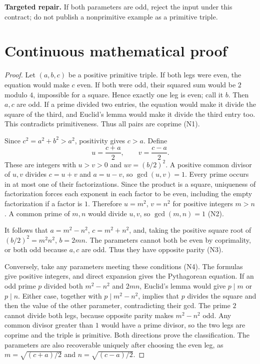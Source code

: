 \documentclass[preprint,12pt,aps,pra,showkeys,amsmath,amssymb,superscriptaddress,floatfix]{revtex4-2}
\theoremstyle{definition}
\theoremstyle{remark}
\newcommand{\field}[2]{\par\smallskip\noindent\textbf{#1.} #2\par}
\begin{document}
\field{Targeted repair}{If both parameters are odd, reject the input under this contract; do not
publish a nonprimitive example as a primitive triple.}

\clearpage\section{Continuous mathematical proof}\label{sec:proof}

\begin{proof}

Let \((a,b,c)\) be a positive primitive triple. If both legs were even,
the equation would make \(c\) even. If both were odd, their squared sum
would be \(2\) modulo \(4\), impossible for a square. Hence exactly one
leg is even; call it \(b\). Then \(a,c\) are odd. If a prime divided two
entries, the equation would make it divide the square of the third, and
Euclid's lemma would make it divide the third entry too. This
contradicts primitiveness. Thus all pairs are coprime (N1).

Since \(c^2=a^2+b^2>a^2\), positivity gives \(c>a\). Define
\[u=\frac{c+a}{2},\qquad v=\frac{c-a}{2}.\] These are integers with
\(u>v>0\) and \(uv=(b/2)^2\). A positive common divisor of \(u,v\)
divides \(c=u+v\) and \(a=u-v\), so \(\gcd(u,v)=1\). Every prime occurs
in at most one of their factorizations. Since the product is a square,
uniqueness of factorization forces each exponent in each factor to be
even, including the empty factorization if a factor is \(1\). Therefore
\(u=m^2\), \(v=n^2\) for positive integers \(m>n\). A common prime of
\(m,n\) would divide \(u,v\), so \(\gcd(m,n)=1\) (N2).

It follows that \(a=m^2-n^2\), \(c=m^2+n^2\), and, taking the positive
square root of \((b/2)^2=m^2n^2\), \(b=2mn\). The parameters cannot both
be even by coprimality, or both odd because \(a,c\) are odd. Thus they
have opposite parity (N3).

Conversely, take any parameters meeting these conditions (N4). The
formulas give positive integers, and direct expansion gives the
Pythagorean equation. If an odd prime \(p\) divided both \(m^2-n^2\) and
\(2mn\), Euclid's lemma would give \(p\mid m\) or \(p\mid n\). Either
case, together with \(p\mid m^2-n^2\), implies that \(p\) divides the
square and then the value of the other parameter, contradicting their
gcd. The prime \(2\) cannot divide both legs, because opposite parity
makes \(m^2-n^2\) odd. Any common divisor greater than \(1\) would have
a prime divisor, so the two legs are coprime and the triple is
primitive. Both directions prove the classification. The parameters are
also recoverable uniquely after choosing the even leg, as
\(m=\sqrt{(c+a)/2}\) and \(n=\sqrt{(c-a)/2}\).

\end{proof}
\end{document}
